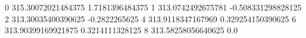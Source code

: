 0 315.30072021484375 1.7181396484375
1 313.0742492675781 -0.508331298828125
2 313.30035400390625 -0.2822265625
4 313.9118347167969 0.329254150390625
6 313.90399169921875 0.3214111328125
8 313.58258056640625 0.0
